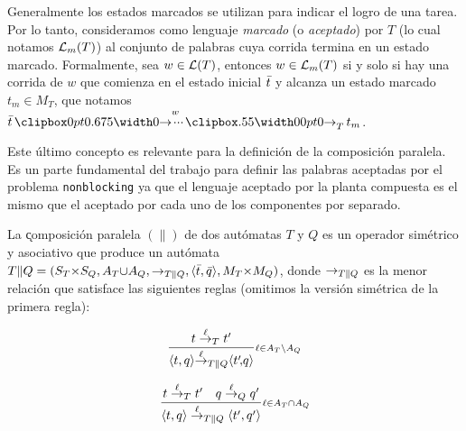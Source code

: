 Generalmente los estados marcados se utilizan para indicar el logro de una tarea. Por lo tanto, consideramos como lenguaje \textit{marcado} (o \textit{aceptado}) por $T$ (lo cual notamos $\mathcal{L}_m(T)$) al conjunto de palabras cuya corrida termina en un estado marcado. Formalmente, sea $w \in \mathcal{L}(T)$, entonces $w \in \mathcal{L}_m(T)$ si y solo si hay una corrida de $w$ que comienza en el estado inicial $\bar{t}$ y alcanza un estado marcado $t_m \in M_T$, que notamos $\init{t} \runw{w}{T} t_m$.

Este último concepto es relevante para la definición de la composición paralela. Es un parte fundamental del trabajo para definir las palabras aceptadas por el problema \texttt{nonblocking} ya que el lenguaje aceptado por la planta compuesta es el mismo que el aceptado por cada uno de los componentes por separado.

\begin{definition}  \label{def:parcomp}
	La \k{composición paralela} $(\|)$ de dos autómatas $T$ y $Q$ es un operador simétrico y asociativo que produce un autómata $T \| Q = (S_T {\times} S_Q, A_T {\cup} 
	A_Q, \rightarrow_{T\|Q}, \langle\bar{t},\bar{q}\rangle, M_T {\times} M_Q)$, donde $\rightarrow_{T\|Q}$ es la menor relación que satisface las siguientes reglas (omitimos la versión simétrica de la primera regla):
	
	\begin{normalsize}
		\centering
		\vspace{-18pt}
		\hspace{-50pt}
		\begin{minipage}{0.30\linewidth}
			\[ 
			\frac{t \overset{\ell}{\rightarrow}_{T} t'}{\langle t,q\rangle {\overset{\ell}{\rightarrow}_{T\|Q}} \langle t'\!,\!q\rangle }{{\scriptstyle \ell \in A_{T} {\setminus} A_{Q}}} 
			\]
		\end{minipage} 
		\hspace{40pt}
		\begin{minipage}{0.30\linewidth}
			\[ 
			\frac{t \overset{\ell}{\rightarrow}_{T} t' \quad q \overset{\ell}{\rightarrow}_{Q} q'}{\langle t,q\rangle \overset{\ell}{\rightarrow}_{T\|Q} \langle t',q'\rangle}{{\scriptstyle \ell \in A_{T} {\cap} A_{Q}}}
			\]
		\end{minipage} \\[15pt]
	\end{normalsize}
\end{definition}

